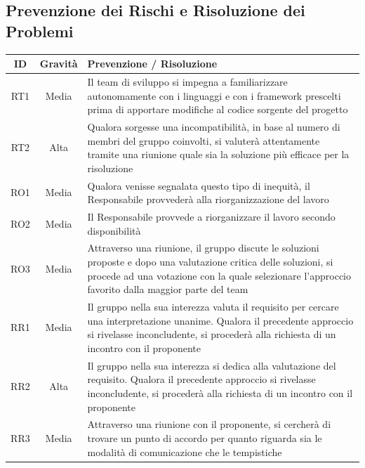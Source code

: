 \documentclass[a4paper, 12pt]{article}
\begin{document}
\subsection{Prevenzione dei Rischi e Risoluzione dei Problemi}
\begin{center}
    \begin{tabularx}{\textwidth}{||c|c||X||}
        \hline
        \textbf{ID} & \textbf{Gravità} & \textbf{Prevenzione / Risoluzione} \\ 
        \hline \hline
        RT1 & Media & Il team di sviluppo si impegna a familiarizzare autonomamente con i linguaggi e con i framework prescelti prima di apportare modifiche al codice sorgente del progetto\\
        \hline
        RT2  & Alta & Qualora sorgesse una incompatibilità, in base al numero di membri del gruppo coinvolti, si valuterà attentamente tramite una riunione quale sia la soluzione più efficace per la risoluzione \\
        \hline
        RO1 & Media & Qualora venisse segnalata questo tipo di inequità, il Responsabile provvederà alla riorganizzazione del lavoro\\
        \hline
        RO2 & Media & Il Responsabile provvede a riorganizzare il lavoro secondo disponibilità\\
        \hline
        RO3 & Media & Attraverso una riunione, il gruppo discute le soluzioni proposte e dopo una valutazione critica delle soluzioni, si procede ad una votazione con la quale selezionare l'approccio favorito dalla maggior parte del team\\
        \hline
        RR1 & Media & Il gruppo nella sua interezza valuta il requisito per cercare una interpretazione unanime. Qualora il precedente approccio si rivelasse inconcludente, si procederà alla richiesta di un incontro con il proponente\\
        \hline
        RR2 & Alta & Il gruppo nella sua interezza si dedica alla valutazione del requisito. Qualora il precedente approccio si rivelasse inconcludente, si procederà alla richiesta di un incontro con il proponente\\
        \hline
        RR3 & Media & Attraverso una riunione con il proponente, si cercherà di trovare un punto di accordo per quanto riguarda sia le modalità di comunicazione che le tempistiche\\
        \hline \hline
    \end{tabularx}
\end{center}
    
\end{document}
